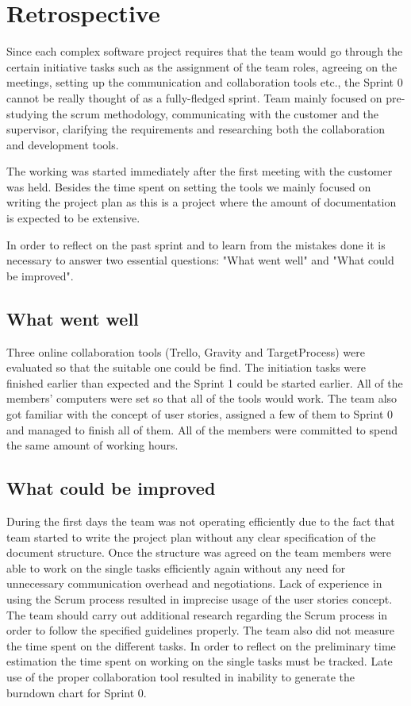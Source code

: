 \section{Retrospective}
Since each complex software project requires that the team would go through the certain initiative tasks such as the assignment of the team roles, agreeing on the meetings, setting up the communication and collaboration tools etc., the Sprint 0 cannot be really thought of as a fully-fledged sprint. Team mainly focused on pre-studying the scrum methodology, communicating with the customer and the supervisor, clarifying the requirements and researching both the collaboration and development tools.

The working was started immediately after the first meeting with the customer was held. Besides the time spent on setting the tools we mainly focused on writing the project plan as this is a project where the amount of documentation is expected to be extensive. 

In order to reflect on the past sprint and to learn from the mistakes done it is necessary to answer two essential questions: "What went well" and "What could be improved".

\subsection{What went well}
Three online collaboration tools (Trello, Gravity and TargetProcess) were evaluated so that the suitable one could be find. The initiation tasks were finished earlier than expected and the Sprint 1 could be started earlier. All of the members' computers were set so that all of the tools would work. The team also got familiar with the concept of user stories, assigned a few of them to Sprint 0 and managed to finish all of them. All of the members were committed to spend the same amount of working hours.

\subsection{What could be improved}
During the first days the team was not operating efficiently due to the fact that team started to write the project plan without any clear specification of the document structure. Once the structure was agreed on the team members were able to work on the single tasks efficiently again without any need for unnecessary communication overhead and negotiations. Lack of experience in using the Scrum process resulted in imprecise usage of the user stories concept. The team should carry out additional research regarding the Scrum process in order to follow the specified guidelines properly. The team also did not measure the time spent on the different tasks. In order to reflect on the preliminary time estimation the time spent on working on the single tasks must be tracked. Late use of the proper collaboration tool resulted in inability to generate the burndown chart for Sprint 0.
